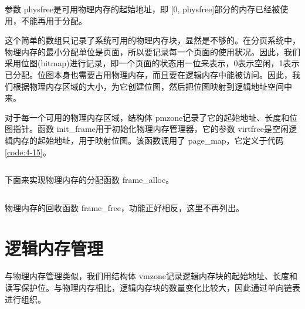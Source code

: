 \documentclass[main.tex]{subfiles}
\begin{document}
\begin{CJK*}{UTF8}{song}
\begin{code}
\label{code:4-8}
\inputminted[firstline=219,lastline=228,linenos,numbersep=5pt,frame=lines,framesep=2mm]{c}{src/chapter04/kernel/machdep.c}
\end{code}

\noindent
参数 phys\-free是可用物理内存的起始地址，即 [0, phys\-free]部分的内存已经被使用，不能再用于分配。

\par
这个简单的数组只记录了系统可用的物理内存块，显然是不够的。在分页系统中，物理内存的最小分配单位是页面，所以要记录每一个页面的使用状况。因此，我们采用位图(bitmap)进行记录，即一个页面的状态用一位来表示，0表示空闲，1表示已分配。位图本身也需要占用物理内存，而且要在逻辑内存中能被访问。因此，我们根据物理内存区域的大小，为它创建位图，然后把位图映射到逻辑地址空间中来。

\par
对于每一个可用的物理内存区域，结构体 pm\-zone记录了它的起始地址、长度和位图指针。函数 init\_\-frame用于初始化物理内存管理器，它的参数 virt\-free是空闲逻辑内存的起始地址，用于映射位图。该函数调用了 page\_\-map，它定义于代码\ref{code:4-15}。

\begin{code}
\label{code:4-9}
\inputminted[firstline=23,lastline=54,linenos,numbersep=5pt,frame=lines,framesep=2mm]{c}{src/chapter04/kernel/frame.c}
\end{code}

下面来实现物理内存的分配函数 frame\_\-alloc。

\begin{code}
\label{code:4-10}
\inputminted[firstline=82,lastline=105,linenos,numbersep=5pt,frame=lines,framesep=2mm]{c}{src/chapter04/kernel/frame.c}
\end{code}

\par
物理内存的回收函数 frame\_\-free，功能正好相反，这里不再列出。

\section{逻辑内存管理}
与物理内存管理类似，我们用结构体 vmzone记录逻辑内存块的起始地址、长度和读写保护位。与物理内存相比，逻辑内存块的数量变化比较大，因此通过单向链表进行组织。

\begin{code}
\label{code:4-11}
\inputminted[firstline=24,lastline=36,linenos,numbersep=5pt,frame=lines,framesep=2mm]{c}{src/chapter04/kernel/page.c}
\end{code}


\end{CJK*}
\end{document}
